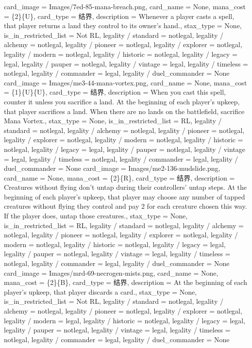 \documentclass[lang = cn, color = black, 10pt]{AllThatStax}
\begin{document}
\card
{
	card_image = Images/7ed-85-mana-breach.png,
	card_name = None,
	mana_cost = \{2\}\{U\},
	card_type = 结界,
	description = Whenever a player casts a spell, that player returns a land they control to its owner's hand.,
	stax_type = None,
	is_in_restricted_list = Not RL,
	legality / standard = notlegal,
	legality / alchemy = notlegal,
	legality / pioneer = notlegal,
	legality / explorer = notlegal,
	legality / modern = notlegal,
	legality / historic = notlegal,
	legality / legacy = legal,
	legality / pauper = notlegal,
	legality / vintage = legal,
	legality / timeless = notlegal,
	legality / commander = legal,
	legality / duel_commander = None
}
\card
{
	card_image = Images/me3-44-mana-vortex.png,
	card_name = None,
	mana_cost = \{1\}\{U\}\{U\},
	card_type = 结界,
	description = When you cast this spell, counter it unless you sacrifice a land.
	At the beginning of each player's upkeep, that player sacrifices a land.
	When there are no lands on the battlefield, sacrifice Mana Vortex.,
	stax_type = None,
	is_in_restricted_list = RL,
	legality / standard = notlegal,
	legality / alchemy = notlegal,
	legality / pioneer = notlegal,
	legality / explorer = notlegal,
	legality / modern = notlegal,
	legality / historic = notlegal,
	legality / legacy = legal,
	legality / pauper = notlegal,
	legality / vintage = legal,
	legality / timeless = notlegal,
	legality / commander = legal,
	legality / duel_commander = None
}
\card
{
	card_image = Images/me2-136-mudslide.png,
	card_name = None,
	mana_cost = \{2\}\{R\},
	card_type = 结界,
	description = Creatures without flying don't untap during their controllers' untap steps.
	At the beginning of each player's upkeep, that player may choose any number of tapped creatures without flying they control and pay {2} for each creature chosen this way. If the player does, untap those creatures.,
	stax_type = None,
	is_in_restricted_list = RL,
	legality / standard = notlegal,
	legality / alchemy = notlegal,
	legality / pioneer = notlegal,
	legality / explorer = notlegal,
	legality / modern = notlegal,
	legality / historic = notlegal,
	legality / legacy = legal,
	legality / pauper = notlegal,
	legality / vintage = legal,
	legality / timeless = notlegal,
	legality / commander = legal,
	legality / duel_commander = None
}
\card
{
	card_image = Images/mrd-69-necrogen-mists.png,
	card_name = None,
	mana_cost = \{2\}\{B\},
	card_type = 结界,
	description = At the beginning of each player's upkeep, that player discards a card.,
	stax_type = None,
	is_in_restricted_list = Not RL,
	legality / standard = notlegal,
	legality / alchemy = notlegal,
	legality / pioneer = notlegal,
	legality / explorer = notlegal,
	legality / modern = legal,
	legality / historic = notlegal,
	legality / legacy = legal,
	legality / pauper = notlegal,
	legality / vintage = legal,
	legality / timeless = notlegal,
	legality / commander = legal,
	legality / duel_commander = None
}
\end{document}
